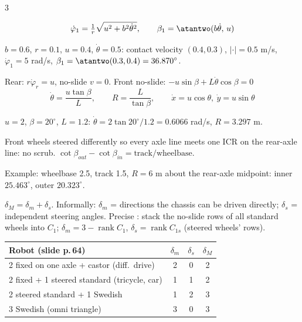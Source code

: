 \begin{multicols}{3}
\columnbreak
{}
\begin{fbx}[Tricycle: front wheel at $(b,0)$ driven + steered; rear axle through $C$ so $v=0$ \pg{56--58}]
\[\dot\varphi_1=\tfrac1r\sqrt{u^2+b^2\dot\theta^2},\qquad\beta_1=\atantwo(b\dot\theta,\,u)\]
\end{fbx}
\begin{worked}[P10.5]
$b=0.6$, $r=0.1$, $u=0.4$, $\dot\theta=0.5$: contact velocity $(0.4,0.3)$, $|{\cdot}|=0.5$ m/s, $\dot\varphi_1=5$ rad/s, $\beta_1=\atantwo(0.3,0.4)=36.870^\circ$. \chk
\end{worked}
\begin{fbx}
Rear: $r\dot\varphi_r=u$, no-slide $v=0$. Front no-slide: $-u\sin\beta+L\dot\theta\cos\beta=0$
\[\dot\theta=\frac{u\tan\beta}{L},\qquad R=\frac L{\tan\beta},\qquad\dot x=u\cos\theta,\ \dot y=u\sin\theta\]
\end{fbx}
\begin{worked}[P10.4]
$u=2$, $\beta=20^\circ$, $L=1.2$: $\dot\theta=2\tan20^\circ/1.2=0.6066$ rad/s, $R=3.297$ m. \chk
\end{worked}
\begin{fbx}
Front wheels steered differently so every axle line meets one ICR on the rear-axle line: no scrub. $\cot\beta_{out}-\cot\beta_{in}=\text{track}/\text{wheelbase}$.
\end{fbx}
Example: wheelbase 2.5, track 1.5, $R=6$ m about the rear-axle midpoint: inner $25.463^\circ$, outer $20.323^\circ$. \chk

$\delta_M=\delta_m+\delta_s$. Informally: $\delta_m$ = directions the chassis can be driven directly; $\delta_s$ = independent steering angles. Precise \added: stack the no-slide rows of all standard wheels into $C_1$; $\delta_m=3-\operatorname{rank}C_1$, $\delta_s=\operatorname{rank}C_{1s}$ (steered wheels' rows).
\begin{tabularx}{\linewidth}{@{}Xccc@{}}\toprule
Robot (slide p.\,64) & $\delta_m$ & $\delta_s$ & $\delta_M$\\\midrule
2 fixed on one axle + castor (diff.\ drive) & 2&0&2\\
2 fixed + 1 steered standard (tricycle, car) & 1&1&2\\
2 steered standard + 1 Swedish & 1&2&3\\
3 Swedish (omni triangle) & 3&0&3\\\bottomrule
\end{tabularx}


\end{multicols}
